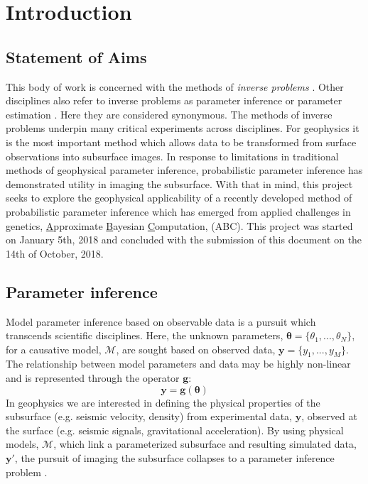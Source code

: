 \chapter{Introduction}


\section{Statement of Aims} 

This body of work is concerned with the methods of \textit{inverse problems} \citep{Tarantola2005,Aster2013,Menke2012,Kaipio2006,Biegler2010,Idier2013}. Other disciplines also refer to inverse problems as parameter inference or parameter estimation \citep{Box1973,Sprott2008,Casella1993,Cox2007}. Here they are considered synonymous. The methods of inverse problems underpin many critical experiments across disciplines. For geophysics it is the most important method which allows data to be transformed from surface observations into subsurface images. In response to limitations in traditional methods of geophysical parameter inference, probabilistic parameter inference has demonstrated utility in imaging the subsurface. With that in mind, this project seeks to explore the geophysical applicability of a recently developed method of probabilistic parameter inference which has emerged from applied challenges in genetics, \underline{A}pproximate \underline{B}ayesian \underline{C}omputation, (ABC). This project was started on January 5th, 2018 and concluded with the submission of this document on the 14th of October, 2018.



\section{Parameter inference}

Model parameter inference based on observable data is a pursuit which transcends scientific disciplines. Here, the unknown parameters, $\bm{\theta} = \{\theta_1,...,\theta_N\}$, for a causative model, $\mathcal{M}$, are sought based on observed data, $\bm{y} = \{y_1,...,y_M\}$. The relationship between model parameters and data may be highly non-linear and is represented through the operator $\bm{g}$:
\begin{equation}
\bm{y} = \bm{g}(\bm{\theta})
\label{basic_data_parameters}
\end{equation}	
In geophysics we are interested in defining the physical properties  of the subsurface (e.g. seismic velocity, density) from experimental data, $\bm{y}$, observed at the surface (e.g. seismic signals, gravitational acceleration). By using physical models, $\mathcal{M}$, which link a parameterized subsurface and resulting simulated data, $\bm{y'}$, the pursuit of imaging the subsurface collapses to a parameter inference problem \citep[p.1-2]{Tarantola2005}.\par


